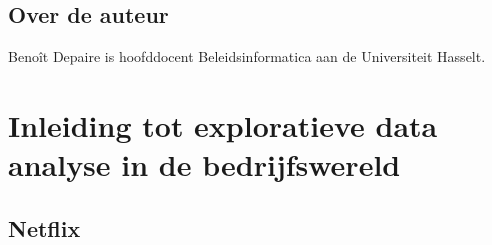 \documentclass[]{memoir}
\begin{document}
\hypertarget{over-de-auteur}{%
\section*{Over de auteur}\label{over-de-auteur}}

Benoît Depaire is hoofddocent Beleidsinformatica aan de Universiteit Hasselt.

\hypertarget{inleiding-tot-exploratieve-data-analyse-in-de-bedrijfswereld}{%
\chapter{Inleiding tot exploratieve data analyse in de bedrijfswereld}\label{inleiding-tot-exploratieve-data-analyse-in-de-bedrijfswereld}}

\hypertarget{netflix}{%
\section{Netflix}\label{netflix}}
\end{document}
